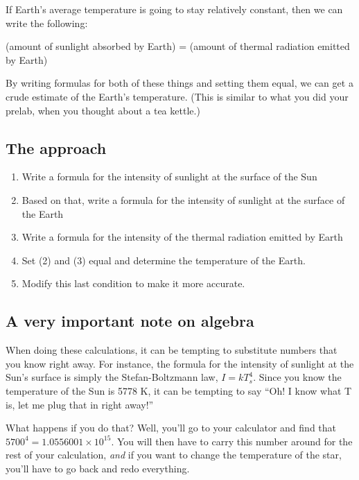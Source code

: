 \documentclass[11pt]{article}
\begin{document}
If Earth's average temperature is going to stay relatively constant, then we can write the following:

\begin{center}
{(amount of sunlight absorbed by Earth) = (amount of thermal radiation emitted by Earth)}
\end{center}

By writing formulas for both of these things and setting them equal, we can get a crude estimate of the Earth's temperature. (This is similar to what you did your prelab, when you thought about a tea kettle.)

\subsection*{The approach}

\begin{enumerate}
\item{Write a formula for the intensity of sunlight at the surface of the Sun}
\item{Based on that, write a formula for the intensity of sunlight at the surface of the Earth}
\item{Write a formula for the intensity of the thermal radiation emitted by Earth}
\item{Set (2) and (3) equal and determine the temperature of the Earth.}
\item{Modify this last condition to make it more accurate.}
\end{enumerate}

\subsection*{A very important note on algebra}

When doing these calculations, it can be tempting to substitute numbers that you know right away. For instance, the formula for the intensity of sunlight at the Sun's surface is 
simply the Stefan-Boltzmann law, $I=kT_s^4$. Since you know the temperature of the Sun is 5778 K, it can be tempting to say ``Oh! I know what T is, let me plug that in right away!''

What happens if you do that? Well, you'll go to your calculator and find that $5700^4 = 1.0556001 \times 10^{15}$. You will then have to carry this number around for the rest of your 
calculation, {\it and} if you want to change the temperature of the star, you'll have to go back and redo everything. 
\end{document}
